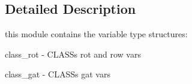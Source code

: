 \subsection{Detailed Description}
this module contains the variable type structures\+: 


\begin{DoxyEnumerate}
\item class\+\_\+rot -\/ C\+L\+A\+S\+S\textquotesingle{}s \textquotesingle{}rot\textquotesingle{} and \textquotesingle{}row\textquotesingle{} vars
\item class\+\_\+gat -\/ C\+L\+A\+S\+S\textquotesingle{}s \textquotesingle{}gat\textquotesingle{} vars 
\end{DoxyEnumerate}